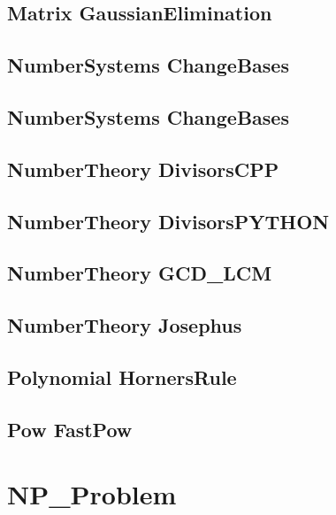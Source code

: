 \subsection{Matrix GaussianElimination}
\raggedbottom
\hrulefill
\subsection{NumberSystems ChangeBases}
\raggedbottom
\hrulefill
\subsection{NumberSystems ChangeBases}
\raggedbottom
\hrulefill
\subsection{NumberTheory DivisorsCPP}
\raggedbottom
\hrulefill
\subsection{NumberTheory DivisorsPYTHON}
\raggedbottom
\hrulefill
\subsection{NumberTheory GCD_LCM}
\raggedbottom
\hrulefill
\subsection{NumberTheory Josephus}
\raggedbottom
\hrulefill
\subsection{Polynomial HornersRule}
\raggedbottom
\hrulefill
\subsection{Pow FastPow}
\raggedbottom
\hrulefill

\section{NP_Problem}
